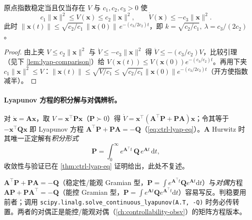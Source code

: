 \begin{theorem}[指数稳定的二次夹刻画]
\label{thm:lyap-exp-quad}
原点指数稳定当且仅当存在 $V$ 与 $c_1,c_2,c_3>0$ 使
\begin{equation}
  c_1\|\mathbf{x}\|^2\le V(\mathbf{x})\le c_2\|\mathbf{x}\|^2,\qquad \dot V(\mathbf{x})\le-c_3\|\mathbf{x}\|^2.
  \label{eq:lyap-exp-sandwich}
\end{equation}
此时 $\|\mathbf{x}(t)\|\le\sqrt{c_2/c_1}\,\|\mathbf{x}(0)\|\,e^{-(c_3/2c_2)t}$，即 $k=\sqrt{c_2/c_1},\ \lambda=c_3/(2c_2)$。
\end{theorem}

\begin{proof}
由上夹 $V\le c_2\|\mathbf{x}\|^2$ 与 $\dot V\le-c_3\|\mathbf{x}\|^2$ 得 $\dot V\le-(c_3/c_2)V$，比较引理（见下 \cref{lem:lyap-comparison}）给 $V(\mathbf{x}(t))\le V(\mathbf{x}(0))e^{-(c_3/c_2)t}$。再用下夹 $c_1\|\mathbf{x}\|^2\le V$：$\|\mathbf{x}(t)\|\le\sqrt{V/c_1}\le\sqrt{c_2/c_1}\|\mathbf{x}(0)\|e^{-(c_3/2c_2)t}$（开方使指数减半）。
\end{proof}

\paragraph{Lyapunov 方程的积分解与对偶辨析。}
对 $\dot{\mathbf{x}}=\mathbf{A}\mathbf{x}$，取 $V=\mathbf{x}^\top\mathbf{P}\mathbf{x}$（$\mathbf{P}\succ0$）得 $\dot V=\mathbf{x}^\top(\mathbf{A}^\top\mathbf{P}+\mathbf{P}\mathbf{A})\mathbf{x}$；令其等于 $-\mathbf{x}^\top\mathbf{Q}\mathbf{x}$ 即 Lyapunov 方程 $\mathbf{A}^\top\mathbf{P}+\mathbf{P}\mathbf{A}=-\mathbf{Q}$（\cref{eq:ctrl-lyap-eq}）。$\mathbf{A}$ Hurwitz 时其唯一正定解有\emph{积分形式}
\begin{equation}
  \mathbf{P}=\int_0^\infty e^{\mathbf{A}^\top t}\,\mathbf{Q}\,e^{\mathbf{A}t}\,\mathrm dt,
  \label{eq:lyap-int-solution}
\end{equation}
收敛性与验证已在 \cref{thm:ctrl-lyap-eq} 证明给出，此处不复述。

\begin{pitfall}
$\mathbf{A}^\top\mathbf{P}+\mathbf{P}\mathbf{A}=-\mathbf{Q}$（稳定性/能观 Gramian 型，$\mathbf{P}=\int e^{\mathbf{A}^\top t}\mathbf{Q}e^{\mathbf{A}t}\mathrm dt$）与\emph{对偶}方程 $\mathbf{A}\mathbf{P}+\mathbf{P}\mathbf{A}^\top=-\mathbf{Q}$（能控 Gramian 型，$\mathbf{P}=\int e^{\mathbf{A}t}\mathbf{Q}e^{\mathbf{A}^\top t}\mathrm dt$）容易写反。判稳要用前者；调用 \texttt{scipy.\allowbreak linalg.\allowbreak solve\_continuous\_lyapunov(A.\allowbreak T, -Q)} 时务必传转置。两者的对偶正是能控/能观对偶（\cref{ch:controllability-obsv}）的矩阵方程版本。
\end{pitfall}

